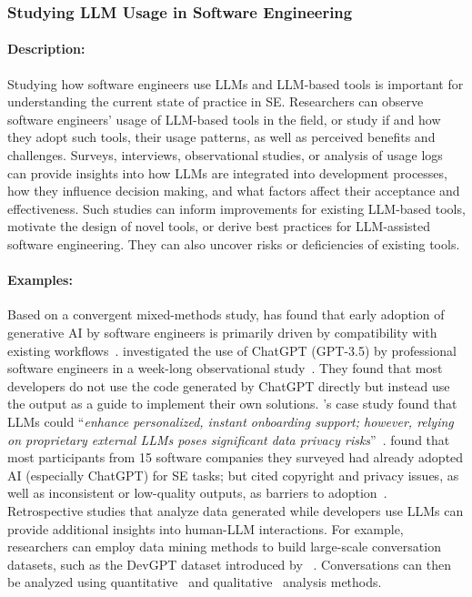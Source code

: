 \documentclass[smallextended]{svjour3}
\newcommand*{\enq}[1]{\enquote{{\itshape#1}}}
\newcommand{\studytypesubsection}[1]{\subsubsection{#1}}
\newcommand{\studytypeparagraph}[1]{\paragraph{\bfseries #1:}}
\newcommand{\studytypesubsection}[1]{\subsection{#1}}
\newcommand{\studytypeparagraph}[1]{\subsubsection{#1}}
\begin{document}
\studytypesubsection{Studying LLM Usage in Software Engineering}
\label{sec:studying-llm-usage-in-software-engineering}

\studytypeparagraph{Description}

Studying how software engineers use LLMs and LLM-based tools is important for understanding the current state of practice in SE.
Researchers can observe software engineers' usage of LLM-based tools in the field, or study if and how they adopt such tools, their usage patterns, as well as perceived benefits and challenges.
Surveys, interviews, observational studies, or analysis of usage logs can provide insights into how LLMs are integrated into development processes, how they influence decision making, and what factors affect their acceptance and effectiveness. 
Such studies can inform improvements for existing LLM-based tools, motivate the design of novel tools, or derive best practices for LLM-assisted software engineering.
They can also uncover risks or deficiencies of existing tools.

\studytypeparagraph{Examples}

Based on a convergent mixed-methods study, \citeauthor{DBLP:journals/tosem/Russo24} has found that early adoption of generative AI by software engineers is primarily driven by compatibility with existing workflows~\cite{DBLP:journals/tosem/Russo24}.
\citeauthor{DBLP:journals/pacmse/KhojahM0N24} investigated the use of ChatGPT (GPT-3.5) by professional software engineers in a week-long observational study~\cite{DBLP:journals/pacmse/KhojahM0N24}.
They found that most developers do not use the code generated by ChatGPT directly but instead use the output as a guide to implement their own solutions.
\citeauthor{DBLP:conf/csee/AzanzaPIG24}'s case study found that LLMs could \enq{enhance personalized, instant onboarding support; however, relying on proprietary external LLMs poses significant data privacy risks}~\cite{DBLP:conf/csee/AzanzaPIG24}. 
 \citeauthor{DBLP:conf/icsa/JahicS24} found that most participants from 15 software companies they surveyed had already adopted AI (especially ChatGPT) for SE tasks; but cited copyright and privacy issues, as well as inconsistent or low-quality outputs, as barriers to adoption~\cite{DBLP:conf/icsa/JahicS24}. 
Retrospective studies that analyze data generated while developers use LLMs can provide additional insights into human-LLM interactions.
For example, researchers can employ data mining methods to build large-scale conversation datasets, such as the DevGPT dataset introduced by \citeauthor{DBLP:conf/msr/XiaoTHM24}~\cite{DBLP:conf/msr/XiaoTHM24}.
Conversations can then be analyzed using quantitative~\cite{DBLP:conf/msr/RabbiCZI24} and qualitative~\cite{DBLP:conf/msr/MohamedPP24} analysis methods.
 
\end{document}
